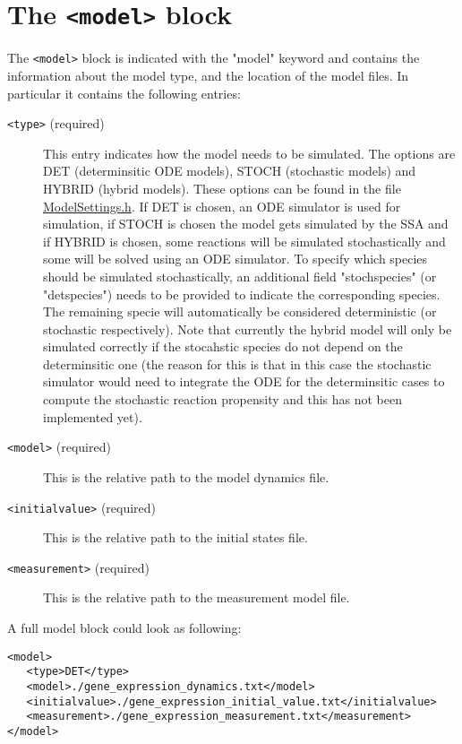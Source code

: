 \documentclass[11pt]{article} %
\begin{document}
\section{The \texttt{<model>} block}
The \texttt{<model>} block is indicated with the "model" keyword and contains the information about the model type, and the location of the model files. In particular it contains the following entries: 
\begin{description}
\item[\texttt{<type>} (required)] This entry indicates how the model needs to be simulated. The options are DET (determinsitic ODE models), STOCH (stochastic models) and HYBRID (hybrid models). These options can be found in the file \href{https://github.com/Mijan/LFNS/blob/publishable/src/models/ModelSettings.h}{ModelSettings.h}. If DET is chosen, an ODE simulator is used for simulation, if STOCH is chosen the model gets simulated by the SSA and if HYBRID is chosen, some reactions will be simulated stochastically and some will be solved using an ODE simulator. To specify which species should be simulated stochastically, an additional field "stochspecies" (or "detspecies") needs to be provided to indicate the corresponding species. The remaining specie will automatically be considered deterministic (or stochastic respectively). Note that currently the hybrid model will only be simulated correctly if the stocahstic species do not depend on the determinsitic one (the reason for this is that in this case the stochastic simulator would need to integrate the ODE for the determinsitic cases to compute the stochastic reaction propensity and this has not been implemented yet). 
\item[\texttt{<model>} (required)] This is the relative path to the model dynamics file. 
\item[\texttt{<initialvalue>} (required)]This is the relative path to the initial states file.
\item[\texttt{<measurement>} (required)] This is the relative path to the measurement model file. 
\end{description}
A full model block could look as following:


\begin{tcolorbox}
\begin{verbatim}
<model>
   <type>DET</type>
   <model>./gene_expression_dynamics.txt</model>
   <initialvalue>./gene_expression_initial_value.txt</initialvalue>
   <measurement>./gene_expression_measurement.txt</measurement>
</model>
\end{verbatim}
\end{tcolorbox}
\end{document}
